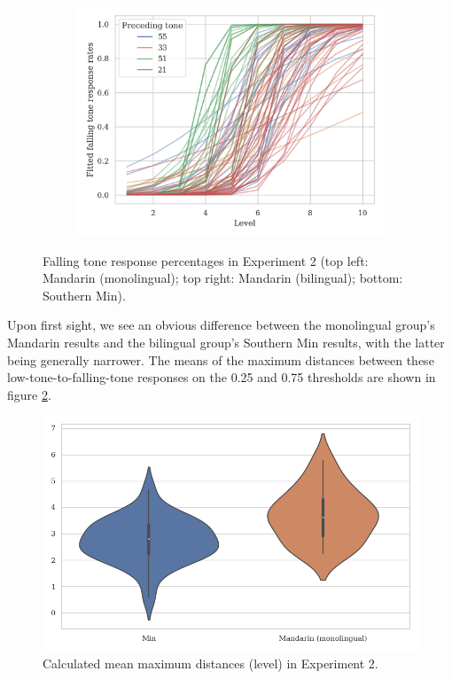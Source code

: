 \documentclass[12pt]{report}
\begin{document}
\begin{CJK}{UTF8}{bsmi}
\begin{figure}[hbt!]
\begin{subfigure}[b]{.45\textwidth}
\end{subfigure}
\hfill
\begin{subfigure}[b]{.45\textwidth}
\centering
\includegraphics[width=\textwidth]{Figures/E2/Min_E2_raw.png}
\end{subfigure}
\caption{Falling tone response percentages in Experiment 2 (top left: Mandarin (monolingual); top right: Mandarin (bilingual); bottom: Southern Min).}
\label{Figure:E2Raw}
\end{figure}

Upon first sight, we see an obvious difference between the monolingual group's Mandarin results and the bilingual group's Southern Min results, with the latter being generally narrower. The means of the maximum distances between these low-tone-to-falling-tone responses on the 0.25 and 0.75 thresholds are shown in figure \ref{Figure:DistBoxPlot}.

\begin{figure}[hbt!]
\centering
\includegraphics[scale=.7, trim={0 .5cm 0 0}]{Figures/E2/Result.png}
\caption{Calculated mean maximum distances (level) in Experiment 2.}
\label{Figure:DistBoxPlot}
\end{figure}


\end{CJK}
\end{document}
